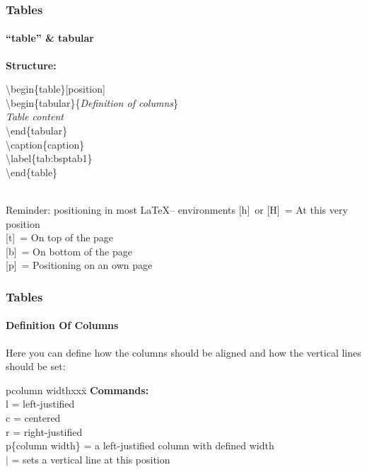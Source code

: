 \begin{frame}
\frametitle{Tables}
\framesubtitle{``table'' \& \glqq tabular\grqq}
\textbf{Structure:}\\[2mm]
\color{unibablueI}\begin{ttfamily}\textbackslash begin\color{black}\{table\}\color{nounibagreenI}[position]\color{black}\\
\color{unibablueI}\textbackslash begin\color{black}\{tabular\}\{\textit{Definition of columns}\}\\
\textit{Table content}\\
\color{unibablueI}\textbackslash end\color{black}\{tabular\}\\
\color{nounibaredI}\textbackslash caption\color{black}\{caption\}\\
\color{nounibaredI}\textbackslash label\color{black}\{tab:bsptab1\}\\
\color{unibablueI}\textbackslash end\color{black}\{table\}\\
~\\
\end{ttfamily}

\begin{block}{Reminder: positioning in most \LaTeX -- environments}
\color{nounibagreenI}[h]\color{black}~or \color{nounibagreenI}[H]\color{black}~= At this very position\\
\color{nounibagreenI}[t]\color{black}~= On top of the page\\ 
\color{nounibagreenI}[b]\color{black}~= On bottom of the page\\ 
\color{nounibagreenI}[p]\color{black}~= Positioning on an own page
\end{block}
\end{frame}


\begin{frame}
\frametitle{Tables}
\framesubtitle{Definition Of Columns}
Here you can define how the columns should be aligned
and how the vertical lines should be set:\\[3mm]
\begin{tabbing}[H]p{column width}xxx\=\kill
\textbf{Commands:}\\
l \>= left-justified\\
c \>= centered\\
r \>= right-justified\\
p\{column width\} \>= a left-justified column with defined width\\
\color{nounibaredI}$|$\color{black} \>= sets a vertical line
at this position\\
\end{tabbing}
\end{frame}

